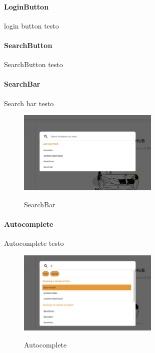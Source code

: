
\paragraph{LoginButton}\label{par:login-button}

login button testo

\paragraph{SearchButton}\label{par:search-button}

SearchButton testo

\paragraph{SearchBar}\label{par:search-bar}

Search bar testo

\begin{figure}[ht]
  \centering
  \includegraphics[width=0.6\textwidth, alt={Barra di ricerca globale dell'applicazione}]{images/frontend/SearchBar.jpg}
  \caption{SearchBar}\label{fig:search-bar}
\end{figure}

\paragraph{Autocomplete}\label{par:autocomplete}

Autocomplete testo

\begin{figure}[ht]
  \centering
  \includegraphics[width=0.6\textwidth, alt={Componente che si occupa della lista dinamica di risultati}]{images/frontend/SearchBar2.jpg}
  \caption{Autocomplete}\label{fig:autocomplete}
\end{figure}

